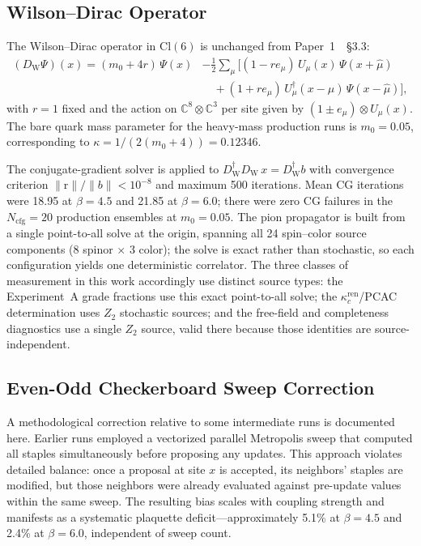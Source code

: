 \documentclass[12pt]{article}
\theoremstyle{definition}
\theoremstyle{remark}
\newcommand{\cl}{\mathrm{Cl}}           %
\newcommand{\dW}{D_{\mathrm{W}}}        %
\newcommand{\kcren}{\kappa_{c}^{\mathrm{ren}}}      %
\newcommand{\Ncfg}{N_{\mathrm{cfg}}}                  %
\begin{document}
	\subsection{Wilson--Dirac Operator}
	\label{sec:wilson-dirac}
	
	The Wilson--Dirac operator in $\cl(6)$ is unchanged from
	Paper~1~\cite{FirestoneP1}~\S3.3:
	\begin{equation}
		\begin{split}
			(\dW\Psi)(x) = (m_0+4r)\,\Psi(x)
			&- \tfrac{1}{2}\sum_\mu\bigl[(1-re_\mu)\,U_\mu(x)\,\Psi(x+\hat{\mu}) \\
			&\quad + (1+re_\mu)\,U_\mu^\dagger(x-\hat{\mu})\,\Psi(x-\hat{\mu})\bigr],
		\end{split}
		\label{eq:wilson-dirac}
	\end{equation}
	with $r=1$ fixed and the action on $\mathbb{C}^8\otimes\mathbb{C}^3$ per site
	given by $(1\pm e_\mu)\otimes U_\mu(x)$.  The bare quark mass parameter for
	the heavy-mass production runs is $m_0=0.05$, corresponding to
	$\kappa=1/(2(m_0+4))=0.12346$.
	
	The conjugate-gradient solver is applied to $\dW^\dagger\dW\,x = \dW^\dagger b$
	with convergence criterion $\|\mathrm{r}\|/\|b\|<10^{-8}$ and maximum 500
	iterations.  Mean CG iterations were 18.95 at $\beta=4.5$ and 21.85 at
	$\beta=6.0$; there were zero CG failures in the $\Ncfg=20$ production
	ensembles at $m_0=0.05$.  The pion propagator is built from a single point-to-all solve at the
	origin, spanning all 24 spin--color source components ($8$ spinor $\times$
	$3$ color); the solve is exact rather than stochastic, so each configuration
	yields one deterministic correlator.  The three classes of measurement in
	this work accordingly use distinct source types: the Experiment~A grade
	fractions use this exact point-to-all solve; the $\kcren$/PCAC determination
	uses $Z_2$ stochastic sources; and the free-field and completeness
	diagnostics use a single $Z_2$ source, valid there because those identities
	are source-independent.
	
	\subsection{Even-Odd Checkerboard Sweep Correction}
	\label{sec:checkerboard}
	
	A methodological correction relative to some intermediate runs is documented
	here.  Earlier runs employed a vectorized parallel Metropolis sweep that
	computed all staples simultaneously before proposing any updates.  This
	approach violates detailed balance: once a proposal at site $x$ is accepted,
	its neighbors' staples are modified, but those neighbors were already
	evaluated against pre-update values within the same sweep.  The resulting
	bias scales with coupling strength and manifests as a systematic plaquette
	deficit---approximately 5.1\% at $\beta=4.5$ and 2.4\% at $\beta=6.0$,
	independent of sweep count.
	
\end{document}
